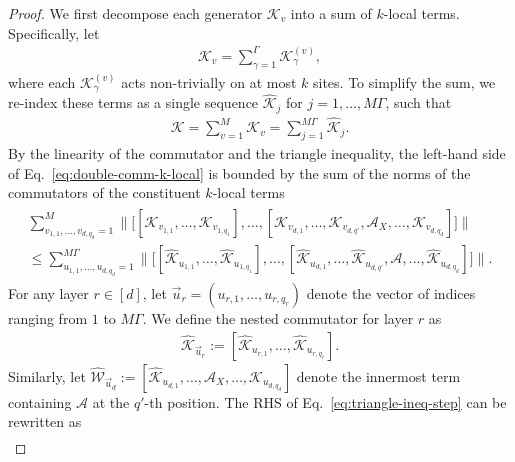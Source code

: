 \documentclass[aps,pra,reprint,groupedaddress,floatfix]{revtex4-2}
\newcommand{\mc}{\mathcal}
\begin{document}
\begin{proof}
    We first decompose each generator $\mathcal{K}_{v}$ into a sum of $k$-local terms. Specifically, let
    \begin{align*}
        \mc K_v = \sum_{\gamma=1}^{\Gamma} \mc K_{\gamma}^{(v)},
    \end{align*}
    where each $\mc K_{\gamma}^{(v)}$ acts non-trivially on at most $k$ sites. To simplify the sum, we re-index these terms as a single sequence $\hat{\mathcal{K}}_{j}$ for $j=1, \ldots, M\Gamma$, such that
    \begin{align*}
        \mc K = \sum_{v=1}^M \mc K_v = \sum_{j=1}^{M\Gamma} \hat{\mc K}_{j}.
    \end{align*}
    By the linearity of the commutator and the triangle inequality, the left-hand side of Eq.~\eqref{eq:double-comm-k-local} is bounded by the sum of the norms of the commutators of the constituent $k$-local terms
    \begin{align}
        \label{eq:triangle-ineq-step}
        \begin{multlined}
             \sum_{v_{1,1}, \ldots, v_{d, q_d}=1}^{M} \bigg\| \Big[ [\mathcal{K}_{v_{1,1}}, \ldots, \mathcal{K}_{v_{1, q_1}}], \ldots, 
        [\mathcal{K}_{v_{d,1}}, \ldots, \mathcal{K}_{v_{d, q'}}, \mathcal{A}_X, \ldots, \mathcal{K}_{v_{d, q_d}}] \Big] \bigg\| \\
        \le \sum_{u_{1,1}, \ldots, u_{d, q_d}=1}^{M\Gamma} \bigg\| \Big[ [\hat{\mathcal{K}}_{u_{1,1}}, \ldots, \hat{\mathcal{K}}_{u_{1, q_1}}], \ldots, 
        [\hat{\mathcal{K}}_{u_{d,1}}, \ldots, \hat{\mathcal{K}}_{u_{d, q'}}, \mathcal{A}, \ldots, \hat{\mathcal{K}}_{u_{d, q_d}}] \Big] \bigg\|.
        \end{multlined}
    \end{align}
    For any layer $r \in [d]$, let $\vec{u}_r = (u_{r,1}, \ldots, u_{r, q_r})$ denote the vector of indices ranging from $1$ to $M\Gamma$. We define the nested commutator for layer $r$ as
    \begin{align*}
        \hat{\mathcal{K}}_{\vec{u}_r} := [\hat{\mathcal{K}}_{u_{r,1}}, \ldots, \hat{\mathcal{K}}_{u_{r, q_r}}].
    \end{align*}
    Similarly, let $\hat{\mathcal{W}}_{\vec{u}_d} := [\hat{\mathcal{K}}_{u_{d,1}}, \ldots, \mathcal{A}_X, \ldots, \hat{\mathcal{K}}_{u_{d, q_d}}]$ denote the innermost term containing $\mc A$ at the $q'$-th position.
    The RHS of Eq.~\eqref{eq:triangle-ineq-step} can be rewritten as
    \begin{align*}

\end{align*}
\end{proof}
\end{document}
